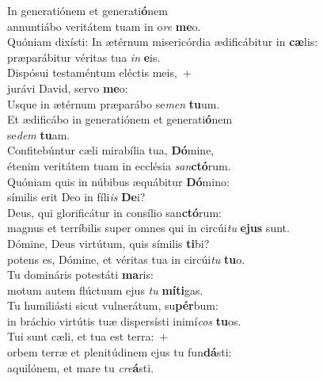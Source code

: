 \evenverse In generatiónem et generati\textbf{ó}nem~\*\\
\evenverse annuntiábo veritátem tuam in o\textit{re} \textbf{me}o.\\
\oddverse Quóniam dixísti: In ætérnum misericórdia ædificábitur in \textbf{cæ}lis:~\*\\
\oddverse præparábitur véritas tua \textit{in} \textbf{e}is.\\
\evenverse Dispósui testaméntum eléctis meis,~+\\
\evenverse  jurávi David, servo \textbf{me}o:~\*\\
\evenverse Usque in ætérnum præparábo se\textit{men} \textbf{tu}um.\\
\oddverse Et ædificábo in generatiónem et generati\textbf{ó}nem~\*\\
\oddverse se\textit{dem} \textbf{tu}am.\\
\evenverse Confitebúntur cæli mirabília tua, \textbf{Dó}mine,~\*\\
\evenverse étenim veritátem tuam in ecclésia \textit{san}\textbf{ctó}rum.\\
\oddverse Quóniam quis in núbibus æquábitur \textbf{Dó}mino:~\*\\
\oddverse símilis erit Deo in fíli\textit{is} \textbf{De}i?\\
\evenverse Deus, qui glorificátur in consílio san\textbf{ctó}rum:~\*\\
\evenverse magnus et terríbilis super omnes qui in circúi\textit{tu} \textbf{e}\textbf{jus} sunt.\\
\oddverse Dómine, Deus virtútum, quis símilis \textbf{ti}bi?~\*\\
\oddverse potens es, Dómine, et véritas tua in circúi\textit{tu} \textbf{tu}o.\\
\evenverse Tu domináris potestáti \textbf{ma}ris:~\*\\
\evenverse motum autem flúctuum ejus \textit{tu} \textbf{mí}\textbf{ti}gas.\\
\oddverse Tu humiliásti sicut vulnerátum, su\textbf{pér}bum:~\*\\
\oddverse in bráchio virtútis tuæ dispersísti inimí\textit{cos} \textbf{tu}os.\\
\evenverse Tui sunt cæli, et tua est terra:~+\\
\evenverse  orbem terræ et plenitúdinem ejus tu fun\textbf{dá}sti:~\*\\
\evenverse aquilónem, et mare tu \textit{cre}\textbf{á}sti.\\
